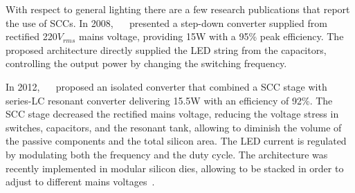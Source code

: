 With respect to general lighting there are a few research publications that report the use of SCCs. In 2008, ~\citeauthor{08Lee}~\cite{08Lee} presented a step-down converter supplied from rectified 220$V_{rms}$ mains voltage, providing 15W with a 95\% peak efficiency. The proposed architecture directly supplied the LED string from the capacitors, controlling the output power by changing the switching frequency.

In 2012, ~\citeauthor{2012Kline}~\cite{2012Kline} proposed an isolated converter that combined a SCC stage with series-LC resonant converter delivering 15.5W with an efficiency of  92\%.  The SCC stage decreased  the rectified mains voltage, reducing the voltage stress in switches, capacitors, and the resonant tank, allowing to diminish  the volume of the passive components and the total silicon area. The LED current is regulated by modulating both the frequency and the duty cycle.  The architecture was recently implemented in modular silicon dies, allowing to be stacked in order to adjust to different mains voltages~\cite{2013Kline}.



